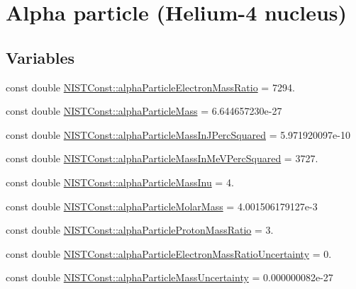 \hypertarget{group___n_i_s_t_const-_alpha}{}\section{Alpha particle (Helium-\/4 nucleus)}
\label{group___n_i_s_t_const-_alpha}
\subsection*{Variables}
\begin{DoxyCompactItemize}
\item 
const double \hyperlink{group___n_i_s_t_const-_alpha_ga9f00b32c60f1bc5b8a950b58e64d08c8}{N\+I\+S\+T\+Const\+::alpha\+Particle\+Electron\+Mass\+Ratio} = 7294.
\item 
const double \hyperlink{group___n_i_s_t_const-_alpha_ga5a2a4f4310d2e3584253471fe4381b93}{N\+I\+S\+T\+Const\+::alpha\+Particle\+Mass} = 6.\+644657230e-\/27
\item 
const double \hyperlink{group___n_i_s_t_const-_alpha_ga90b635a865e315d2c4cd14c26560c7dd}{N\+I\+S\+T\+Const\+::alpha\+Particle\+Mass\+In\+J\+Perc\+Squared} = 5.\+971920097e-\/10
\item 
const double \hyperlink{group___n_i_s_t_const-_alpha_ga34f456e4d23d54ea0231ada958882a38}{N\+I\+S\+T\+Const\+::alpha\+Particle\+Mass\+In\+Me\+V\+Perc\+Squared} = 3727.
\item 
const double \hyperlink{group___n_i_s_t_const-_alpha_ga1233ffb0d6537e112ce39623e6c6d0d5}{N\+I\+S\+T\+Const\+::alpha\+Particle\+Mass\+Inu} = 4.
\item 
const double \hyperlink{group___n_i_s_t_const-_alpha_ga06d92f78de04d4e1d79b8468b04959ef}{N\+I\+S\+T\+Const\+::alpha\+Particle\+Molar\+Mass} = 4.\+001506179127e-\/3
\item 
const double \hyperlink{group___n_i_s_t_const-_alpha_ga4629465057dc35ad7eecca610bcbd092}{N\+I\+S\+T\+Const\+::alpha\+Particle\+Proton\+Mass\+Ratio} = 3.
\item 
const double \hyperlink{group___n_i_s_t_const-_alpha_gab0ff5a8444a405504f7bc319cc48561d}{N\+I\+S\+T\+Const\+::alpha\+Particle\+Electron\+Mass\+Ratio\+Uncertainty} = 0.
\item 
const double \hyperlink{group___n_i_s_t_const-_alpha_ga9183d4ef147d5a96c2980b37937ecfc4}{N\+I\+S\+T\+Const\+::alpha\+Particle\+Mass\+Uncertainty} = 0.\+000000082e-\/27
\item 

\end{DoxyCompactItemize}
